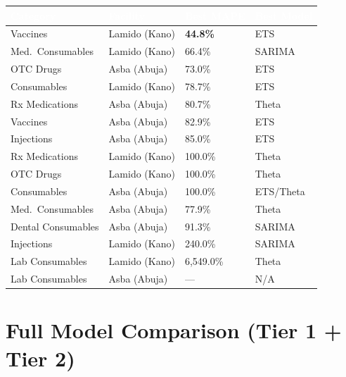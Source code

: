 \documentclass[12pt, a4paper]{article}
\begin{document}
\vspace{0.5em}
\noindent
\begin{tabularx}{\textwidth}{@{} L{3.6cm} L{3.2cm} R{2cm} L{3.5cm} @{}}
  \toprule
  \textcolor{white}{\textbf{Category}} &
  \textcolor{white}{\textbf{Facility}} &
  \textcolor{white}{\textbf{Best MAPE}} &
  \textcolor{white}{\textbf{Best Model}} \\
  \midrule
  Vaccines           & Lamido (Kano)  & \textbf{44.8\%}   & ETS \\
  Med.\ Consumables  & Lamido (Kano)  & 66.4\%   & SARIMA \\
  OTC Drugs          & Asba (Abuja)   & 73.0\%   & ETS \\
  Consumables        & Lamido (Kano)  & 78.7\%   & ETS \\
  Rx Medications     & Asba (Abuja)   & 80.7\%   & Theta \\
  Vaccines           & Asba (Abuja)   & 82.9\%   & ETS \\
  Injections         & Asba (Abuja)   & 85.0\%   & ETS \\
  Rx Medications     & Lamido (Kano)  & 100.0\%  & Theta \\
  OTC Drugs          & Lamido (Kano)  & 100.0\%  & Theta \\
  Consumables        & Asba (Abuja)   & 100.0\%  & ETS/Theta \\
  Med.\ Consumables  & Asba (Abuja)   & 77.9\%   & Theta \\
  Dental Consumables & Asba (Abuja)   & 91.3\%   & SARIMA \\
  Injections         & Lamido (Kano)  & 240.0\%  & SARIMA \\
  Lab Consumables    & Lamido (Kano)  & 6{,}549.0\% & Theta \\
  Lab Consumables    & Asba (Abuja)   & ---      & N/A \\
  \bottomrule
\end{tabularx}
\vspace{0.3em}
\label{tab:best}

\section{Full Model Comparison (Tier 1 + Tier 2)}
\end{document}
